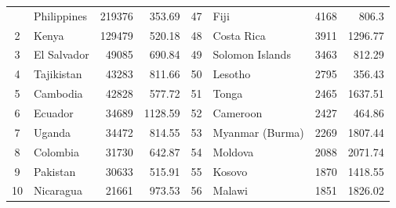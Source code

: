\begin{longtable}{|c|l|r|r|c|l|r|r|}
	\hline \hline
	\endlastfoot
	1           & Philippines           & 219376                             & 353.69                          & 47          & Fiji                  & 4168                               & 806.3                           \\
	2           & Kenya                 & 129479                             & 520.18                          & 48          & Costa Rica            & 3911                               & 1296.77                         \\
	3           & El Salvador           & 49085                              & 690.84                          & 49          & Solomon Islands       & 3463                               & 812.29                          \\
	4           & Tajikistan            & 43283                              & 811.66                          & 50          & Lesotho               & 2795                               & 356.43                          \\
	5           & Cambodia              & 42828                              & 577.72                          & 51          & Tonga                 & 2465                               & 1637.51                         \\
	6           & Ecuador               & 34689                              & 1128.59                         & 52          & Cameroon              & 2427                               & 464.86                          \\
	7           & Uganda                & 34472                              & 814.55                          & 53          & Myanmar (Burma)       & 2269                               & 1807.44                         \\
	8           & Colombia              & 31730                              & 642.87                          & 54          & Moldova               & 2088                               & 2071.74                         \\
	9           & Pakistan              & 30633                              & 515.91                          & 55          & Kosovo                & 1870                               & 1418.55                         \\
	10          & Nicaragua             & 21661                              & 973.53                          & 56          & Malawi                & 1851                               & 1826.02                         \\

\end{longtable}

